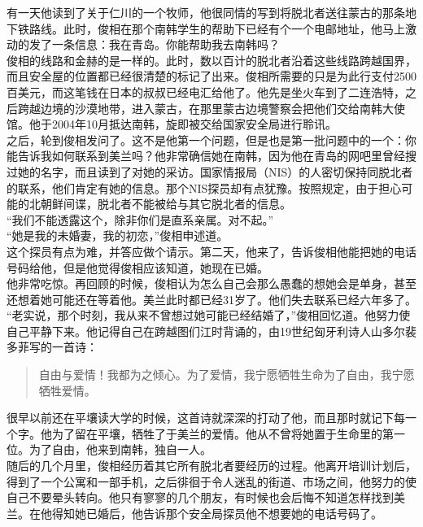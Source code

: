 有一天他读到了关于仁川的一个牧师，他很同情的写到将脱北者送往蒙古的那条地下铁路线。此时，俊相在那个南韩学生的帮助下已经有个一个电邮地址，他马上激动的发了一条信息：我在青岛。你能帮助我去南韩吗？\\

俊相的线路和金赫的是一样的。此时，数以百计的脱北者沿着这些线路跨越国界，而且安全屋的位置都已经很清楚的标记了出来。俊相所需要的只是为此行支付2500百美元，而这笔钱在日本的叔叔已经电汇给他了。他先是坐火车到了二连浩特，之后跨越边境的沙漠地带，进入蒙古，在那里蒙古边境警察会把他们交给南韩大使馆。他于2004年10月抵达南韩，旋即被交给国家安全局进行聆讯。\\

之后，轮到俊相发问了。这不是他第一个问题，但是也是第一批问题中的一个：你能告诉我如何联系到美兰吗？他非常确信她在南韩，因为他在青岛的网吧里曾经搜过她的名字，而且读到了对她的采访。国家情报局（NIS）的人密切保持同脱北者的联系，他们肯定有她的信息。那个NIS探员却有点犹豫。按照规定，由于担心可能的北朝鲜间谍，脱北者不能被给与其它脱北者的信息。\\

“我们不能透露这个，除非你们是直系亲属。对不起。”\\

“她是我的未婚妻，我的初恋，”俊相申述道。\\

这个探员有点为难，并答应做个请示。第二天，他来了，告诉俊相他能把她的电话号码给他，但是他觉得俊相应该知道，她现在已婚。\\

他非常吃惊。再回顾的时候，俊相认为怎么自己会那么愚蠢的想她会是单身，甚至还想着她可能还在等着他。美兰此时都已经31岁了。他们失去联系已经六年多了。\\

“老实说，那个时刻，我从来不曾想过她可能已经结婚了，”俊相回忆道。他努力使自己平静下来。他记得自己在跨越图们江时背诵的，由19世纪匈牙利诗人山多尔裴多菲写的一首诗：\\

\begin{quote}
	自由与爱情！我都为之倾心。为了爱情，我宁愿牺牲生命为了自由，我宁愿牺牲爱情。\\
\end{quote}

很早以前还在平壤读大学的时候，这首诗就深深的打动了他，而且那时就记下每一个字。他为了留在平壤，牺牲了于美兰的爱情。他从不曾将她置于生命里的第一位。为了自由，他来到南韩，独自一人。\\

随后的几个月里，俊相经历着其它所有脱北者要经历的过程。他离开培训计划后，得到了一个公寓和一部手机，之后徘徊于令人迷乱的街道、市场之间，他努力的使自己不要晕头转向。他只有寥寥的几个朋友，有时候也会后悔不知道怎样找到美兰。在他得知她已婚后，他告诉那个安全局探员他不想要她的电话号码了。\\

